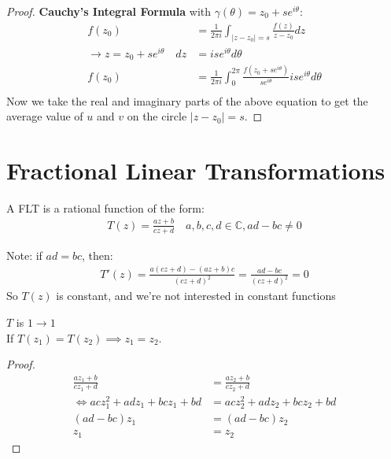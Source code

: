 \begin{proof}
    \textbf{Cauchy's Integral Formula} with $\gamma(\theta) = z_0 + se^{i\theta}$:
    \begin{align*}
        f(z_0)                                      & = \frac{1}{2\pi i} \int_{|z - z_0| = s} \frac{f(z)}{z - z_0}dz                                    \\
        \rightarrow z = z_0 + se^{i\theta} \quad dz & = ise^{i\theta}d\theta                                                                            \\
        f(z_0)                                      & = \frac{1}{2\pi i} \int_{0}^{2\pi} \frac{f(z_0 + se^{i\theta})}{se^{i\theta}}ise^{i\theta}d\theta \\
    \end{align*}
    Now we take the real and imaginary parts of the above equation to get the average value of \( u \) and \( v \) on the circle \( |z - z_0| = s \).

\end{proof}

\section{Fractional Linear Transformations}

\begin{definition}
    A FLT is a rational function of the form:
    \begin{align*}
        T(z) = \frac{az + b}{cz + d} \quad a,b,c,d \in \mathbb{C}, ad - bc \neq 0
    \end{align*}
\end{definition}

\begin{remark}
    Note: if $ad = bc$, then:
    \begin{align*}
        T'(z) = \frac{a (cz + d) - (az + b)c}{(cz + d)^2} = \frac{ad - bc}{(cz + d)^2} = 0
    \end{align*}
    So $T(z)$ is constant, and we're not interested in constant functions
\end{remark}

\begin{claim}
    $T$ is $1 \to 1$\\
    If $T(z_1) = T(z_2) \implies z_1 = z_2$.
    \begin{proof}
        \begin{align*}
            \frac{az_1 + b}{cz_1 + d}         & = \frac{az_2 + b}{cz_2 + d}    \\
            \iff acz_1^2 + adz_1 + bcz_1 + bd & = acz_2^2 + adz_2 + bcz_2 + bd \\
            (ad - bc)z_1                      & = (ad - bc)z_2                 \\
            z_1                               & = z_2
        \end{align*}
    \end{proof}
\end{claim}

